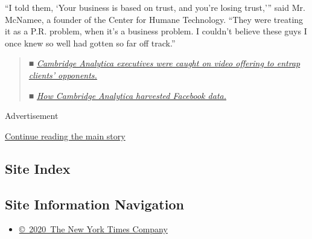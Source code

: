 ``I told them, `Your business is based on trust, and you're losing
trust,''' said Mr. McNamee, a founder of the Center for Humane
Technology. ``They were treating it as a P.R. problem, when it's a
business problem. I couldn't believe these guys I once knew so well had
gotten so far off track.''

\begin{quote}
\emph{■}
\href{https://www.nytimes3xbfgragh.onion/2018/03/19/us/cambridge-analytica-alexander-nix.html?action=click\&module=Intentional\&pgtype=Article}{\emph{Cambridge
Analytica executives were caught on video offering to entrap clients'
opponents.}}

\emph{■}
\href{https://www.nytimes3xbfgragh.onion/2018/03/19/technology/facebook-cambridge-analytica-explained.html?action=click\&module=Intentional\&pgtype=Article}{\emph{How
Cambridge Analytica harvested Facebook data.}}
\end{quote}

Advertisement

\protect\hyperlink{after-bottom}{Continue reading the main story}

\hypertarget{site-index}{%
\subsection{Site Index}\label{site-index}}

\hypertarget{site-information-navigation}{%
\subsection{Site Information
Navigation}\label{site-information-navigation}}

\begin{itemize}
\tightlist
\item
  \href{https://help.nytimes3xbfgragh.onion/hc/en-us/articles/115014792127-Copyright-notice}{©~2020~The
  New York Times Company}
\end{itemize}

